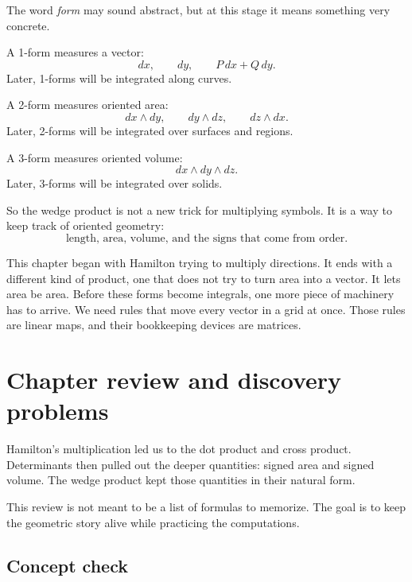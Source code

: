 The word \emph{form} may sound abstract, but at this stage it means something very
concrete.

A 1-form measures a vector:
\[
    dx,
    \qquad
    dy,
    \qquad
    P\,dx+Q\,dy.
\]
Later, 1-forms will be integrated along curves.

A 2-form measures oriented area:
\[
    dx\wedge dy,
    \qquad
    dy\wedge dz,
    \qquad
    dz\wedge dx.
\]
Later, 2-forms will be integrated over surfaces and regions.

A 3-form measures oriented volume:
\[
    dx\wedge dy\wedge dz.
\]
Later, 3-forms will be integrated over solids.

So the wedge product is not a new trick for multiplying symbols.  It is a way to keep
track of oriented geometry:
\[
    \text{length, area, volume, and the signs that come from order.}
\]

This chapter began with Hamilton trying to multiply directions.  It ends with a different
kind of product, one that does not try to turn area into a vector.  It lets area be area.
Before these forms become integrals, one more piece of machinery has to arrive.  We
need rules that move every vector in a grid at once.  Those rules are linear maps, and
their bookkeeping devices are matrices.

\section{Chapter review and discovery problems}

Hamilton's multiplication led us to the dot product and cross product.  Determinants
then pulled out the deeper quantities: signed area and signed volume.  The wedge
product kept those quantities in their natural form.

This review is not meant to be a list of formulas to memorize.  The goal is to keep the
geometric story alive while practicing the computations.

\subsection{Concept check}

